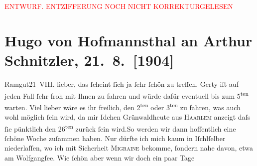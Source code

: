 
\begin{center}
            \textcolor{red}{ENTWURF. ENTZIFFERUNG NOCH NICHT KORREKTURGELESEN}
                      \end{center}
            
               \section[Hugo von Hofmannsthal an Arthur Schnitzler, 21. 8. {[}1904{]}]{ Hugo von Hofmannsthal an Arthur Schnitzler, 21. 8. {[}1904{]}}\nopagebreak{}\rehead{ }\begin{ledgroupsized}[t]{13cm}\normalsize\beginnumbering{} \toendnotes[C]{\smallbreak\pagebreak[2]} 
\toendnotes[C]{\smallbreak}\pstart
           \raggedleft{}{\pb}Ramgut21 VIII.\pend
           \pstart{}lieber, \pend\pstart
           das ſcheint ſich ja ſehr ſchön zu treffen. Gerty
               iſt auf jeden Fall ſehr froh mit Ihnen zu fahren und würde dafür eventuell bis zum
                     5\textsuperscript{ten} warten. Viel lieber wäre es ihr freilich, den 2\textsuperscript{ten} oder 3\textsuperscript{ten} zu fahren, was auch wohl möglich ſein wird, da mir Idchen Grünwaldheute aus \textsc{Haarlem} anzeigt daſs ſie pünktlich den 26\textsuperscript{ten} zurück ſein wird.\hspace*{1.5em}So werden wir dann
               hoffentlich eine ſchöne Woche zuſammen haben. Nur dürfte ich mich kaum in Iſchlſelber niederlaſſen, wo ich mit Sicherheit \textsc{Migraine} bekomme, ſondern nahe davon, etwa am Wolfgangſee. Wie ſchön {\pb}aber wenn wir doch ein paar Tage

\end{ledgroupsized}
